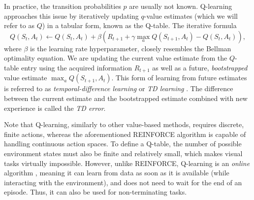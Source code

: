 In practice, the transition probabilities $p$ are usually not known. Q-learning \cite{q-learning} approaches this issue by iteratively updating $q$-value estimates (which we will refer to as $Q$) in a tabular form, known as the Q-table. The iterative formula
\begin{equation*}
    Q\left(S_t, A_t\right) \gets Q\left(S_t, A_t\right) + \beta\left(R_{t+1} + \gamma \max_a Q\left(S_{t+1}, A_t\right) - Q\left(S_t, A_t\right)\right),
\end{equation*}
where $\beta$ is the learning rate hyperparameter, closely resembles the Bellman optimality equation. We are updating the current value estimate from the $Q$-table entry using the acquired information $R_{t+1}$ as well as a future, \textit{bootstrapped} value estimate $\max_a Q\left(S_{t+1}, A_t\right)$. This form of learning from future estimates is referred to as \textit{temporal-difference learning} or \textit{TD learning} \cite{td-learning}. The difference between the current estimate and the bootstrapped estimate combined with new experience is called the \textit{TD error}.

Note that Q-learning, similarly to other value-based methods, requires discrete, finite actions, whereas the aforementioned REINFORCE algorithm is capable of handling continuous action spaces. To define a Q-table, the number of possible environment states must also be finite and relatively small, which makes visual tasks virtually impossible. However, unlike REINFORCE, Q-learning is an \mbox{\textit{online}} algorithm \cite{bible}, meaning it can learn from data as soon as it is available (while interacting with the environment), and does not need to wait for the end of an episode. Thus, it can also be used for non-terminating tasks.